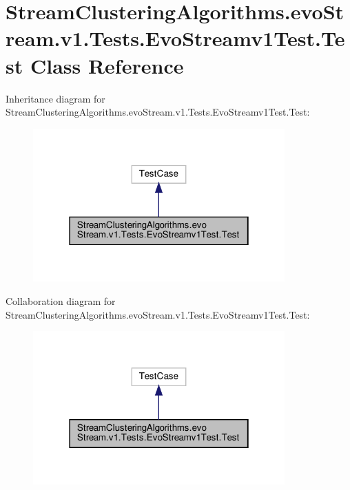 \hypertarget{classStreamClusteringAlgorithms_1_1evoStream_1_1v1_1_1Tests_1_1EvoStreamv1Test_1_1Test}{}\section{Stream\+Clustering\+Algorithms.\+evo\+Stream.\+v1.\+Tests.\+Evo\+Streamv1\+Test.\+Test Class Reference}
\label{classStreamClusteringAlgorithms_1_1evoStream_1_1v1_1_1Tests_1_1EvoStreamv1Test_1_1Test}


Inheritance diagram for Stream\+Clustering\+Algorithms.\+evo\+Stream.\+v1.\+Tests.\+Evo\+Streamv1\+Test.\+Test\+:\nopagebreak
\begin{figure}[H]
\begin{center}
\leavevmode
\includegraphics[width=274pt]{classStreamClusteringAlgorithms_1_1evoStream_1_1v1_1_1Tests_1_1EvoStreamv1Test_1_1Test__inherit__graph}
\end{center}
\end{figure}


Collaboration diagram for Stream\+Clustering\+Algorithms.\+evo\+Stream.\+v1.\+Tests.\+Evo\+Streamv1\+Test.\+Test\+:\nopagebreak
\begin{figure}[H]
\begin{center}
\leavevmode
\includegraphics[width=274pt]{classStreamClusteringAlgorithms_1_1evoStream_1_1v1_1_1Tests_1_1EvoStreamv1Test_1_1Test__coll__graph}
\end{center}
\end{figure}

